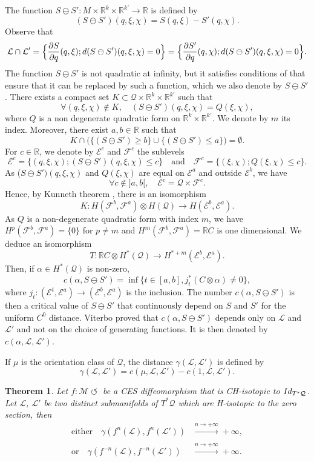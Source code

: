 \documentclass[11pt]{article}
\numberwithin{equation}{section}
\numberwithin{figure}{section}
\numberwithin{table}{section}
\providecommand{\righttoleftarrow}{\mathrel{\circlearrowleft}}
\newtheorem{theorem}{Theorem}
\theoremstyle{definition}
\def\R{\mathbb{R}}
\def\cE{{\mathcal E}}
\def\cF{{\mathcal F}}
\def\cL{{\mathcal L}}
\def\cM{{\mathcal M}}
\def\cQ{{\mathcal Q}}
\begin{document}
The function $S\ominus S':M\times \R^k\times \R^{k'}\to \R$ is defined by
\[
(S\ominus S')(q, \xi, \chi)=S(q, \xi)-S'(q, \chi).
\]
Observe that
\[
\cL\cap\cL'=\Bigl\{\frac{\partial S}{\partial q}(q,\xi); d(S\ominus S')(q, \xi, \chi)=0\Bigr\}=\Bigl\{\frac{\partial S'}{\partial q}(q, \chi); d(S\ominus S')(q, \xi, \chi)=0\Bigr\}.
\]
The function $S\ominus S'$ is not quadratic at infinity, but it satisfies conditions of \cite[Prop.\,1.6.]{Vit2004} that ensure that it can be replaced by such a function, which we also denote by $S\ominus S'$.
There exists a compact set $K\subset \cQ\times \R^k\times \R^{k'}$ such that
\[
\forall (q, \xi, \chi)\notin K,\quad (S\ominus S')(q, \xi, \chi)=Q(\xi, \chi),
\]
where $Q$ is a non degenerate quadratic form on $\R^k\times \R^{k'}$. We denote by $m$ its index. Moreover, there exist $a, b\in\R$ such that
\[
K\cap \Big(\{ (S\ominus S')\geq b\}\cup \{ (S\ominus S')\leq a\}\Big)=\emptyset.
\]
For $c\in\R$, we denote by $\cE^c$ and $\cF^c$ the sublevels
\[
\cE^c=\{ (q, \xi, \chi); (S\ominus S')(q, \xi, \chi)\leq c\}\quad\text{and}\quad \cF^c=\{ (\xi, \chi); Q(\xi, \chi)\leq c\}.
\]
As ($S\ominus S')(q, \xi, \chi)$ and $Q(\xi, \chi)$ are equal on $\cE^a$ and outside $\cE^b$, we have
\[
\forall c\notin{}]a, b[,\quad \cE^c=\cQ\times \cF^c.
\]
Hence, by Kunneth theorem \cite{God1971},
there is an isomorphism
\[
K:H(\cF^b, \cF^a)\otimes H(\cQ)\to H(\cE^b, \cE^a).
\]
As $Q$ is a non-degenerate quadratic form with index $m$, we have $H^p(\cF^b, \cF^a)=\{ 0\}$ for $p\not=m$ and $H^m(\cF^b, \cF^a)=\R C$ is one dimensional. We deduce an isomorphism
\[
T:\R C\otimes H^*(\cQ)\to H^{*+m}(\cE^b, \cE^a).
\]
Then, if $\alpha\in H^*(\cQ)$ is non-zero,
\[
c(\alpha, S\ominus S')=\inf\{ t\in [a, b], j_t^*(C\otimes\alpha)\not=0\},
\]
where $j_t:(\cE^t, \cE^a)\to (\cE^b, \cE^a)$ is the inclusion. The number $c(\alpha, S\ominus S')$ is then a critical value of $S\ominus S'$ that continuously depend on $S$ and $S'$ for the uniform $C^0$ distance.
Viterbo proved that $c(\alpha, S\ominus S')$ depends only on $\cL$ and $\cL'$ and not on the choice of generating functions. It is then denoted by $c(\alpha, \cL, \cL')$.

If $\mu$ is the orientation class of $\cQ$, the distance $\gamma(\cL,\cL')$ is defined by
\[
\gamma(\cL, \cL')=c(\mu, \cL, \cL')-c(1, \cL, \cL').
\]

\begin{theorem}\label{Tconformgamma}
Let $f: \cM \righttoleftarrow$ be a CES diffeomorphism that is CH-isotopic to ${\rm Id}_{T^*\cQ}$. Let $\cL$, $\cL'$ be two distinct submanifolds of $T^*\cQ$ which are H-isotopic to the zero section, then
\begin{align*}
\text{either}\quad\gamma (f^n(\cL), f^n(\cL'))&\xrightarrow[]{n\to +\infty}+\infty,\\
\text{or}\quad\gamma (f^{-n}(\cL), f^{-n}(\cL'))&\xrightarrow[]{n\to +\infty}+\infty.
\end{align*}
\end{theorem}
\end{document}
